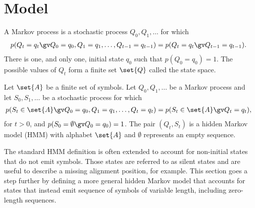 \section{Model}

\begin{definition}\label{def:mp}
  A Markov process is a stochastic process $Q_0, Q_1, \dots$ for which
  \begin{align*}
    p(Q_t=q_t \gv Q_0=q_0, Q_1=q_1, \dots, Q_{t-1}=q_{t-1}) = p(Q_t=q_t \gv Q_{t-1}=q_{t-1}).
  \end{align*}
  There is one, and only one, initial state $q_0$ such that $p(Q_0=q_0)=1$.
  The possible values of $Q_t$ form a finite set $\set{Q}$ called the state space.
\end{definition}

\begin{definition}\label{def:hmm}
  Let $\set{A}$ be a finite set of symbols.
  Let $Q_0, Q_1, \dots$ be a Markov process and let $S_0, S_1, \dots$
  be a stochastic process for which
  \begin{align*}
    p(S_t\in\set{A} \gv Q_0=q_0, Q_1=q_1, \dots, Q_t=q_t) = p(S_t\in\set{A} \gv Q_t=q_t),
  \end{align*}
  for $t>0$, and $p(S_0=\emptyset \gv Q_0=q_0)=1$.
  The pair $(Q_t, S_t)$ is a hidden Markov model (HMM) with alphabet $\set{A}$ and $\emptyset$
  represents an empty sequence.
\end{definition}

The standard HMM definition is often extended to account for non-initial states that
do not emit symbols. Those states are referred to as silent states and are useful to
describe a missing alignment position, for example. This section goes a step further by
defining a more general hidden Markov model that accounts for states that instead emit
sequence of symbols of variable length, including zero-length sequences.


